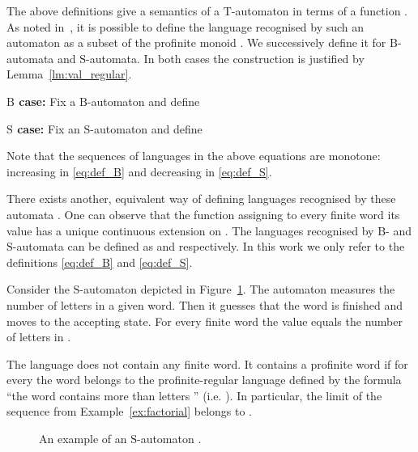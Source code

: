 \documentclass{LMCS}
\newcommand{\fT}{\ensuremath{\mathrm{T}}\xspace}
\newcommand{\fB}{\ensuremath{\mathrm{B}}\xspace}
\newcommand{\fS}{\ensuremath{\mathrm{S}}\xspace}
\newcommand{\aut}[1]{\ensuremath{\mathcal {#1}}\xspace}
\begin{document}
The above definitions give a semantics of a \fT-automaton in terms of a function . As noted in~\cite{torunczyk_limitedness}, it is possible to define the language recognised by such an automaton as a subset of the profinite monoid . We successively define it for \fB-automata and \fS-automata. In both cases the construction is justified by Lemma~\ref{lm:val_regular}.

{\bf \fB case:} Fix a \fB-automaton  and define


{\bf \fS case:} Fix an \fS-automaton  and define


\noindent Note that the sequences of languages in the above equations are monotone: increasing in \eqref{eq:def_B} and decreasing in \eqref{eq:def_S}.

\newcommand{\vfun}{\mathrm{val}_{\aut{A}}}

There exists another, equivalent way of defining languages recognised by these automata \cite{torunczyk_limitedness}. One can observe that the function  assigning to every finite word its value has a unique continuous extension on . The languages recognised by \fB- and \fS-automata can be defined as  and  respectively. In this work we only refer to the definitions \eqref{eq:def_B} and \eqref{eq:def_S}.

\begin{example}
Consider the \fS-automaton  depicted in Figure~\ref{fig:S}. The automaton measures the number of letters  in a given word. Then it guesses that the word is finished and moves to the accepting state. For every finite word  the value  equals the number of letters  in .

The language  does not contain any finite word. It contains a profinite word  if for every  the word  belongs to the profinite-regular language defined by the formula ``the word contains more than  letters '' (i.e. ). In particular, the limit of the sequence  from Example~\ref{ex:factorial} belongs to .

\begin{figure}
\caption{An example of an \fS-automaton .}
\label{fig:S}
\end{figure}
\end{example}
\end{document}
